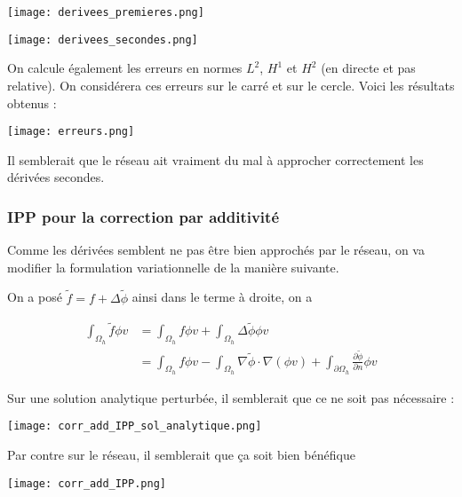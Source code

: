 \begin{minipage}{0.48\linewidth}
	\centering
	\texttt{[image: derivees\_premieres.png]}
\end{minipage}
\begin{minipage}{0.48\linewidth}
	\centering
	\texttt{[image: derivees\_secondes.png]}
\end{minipage}

\newpage

On calcule également les erreurs en normes $L^2$, $H^1$ et $H^2$ (en directe et pas relative). On considérera ces erreurs sur le carré et sur le cercle. Voici les résultats obtenus :

\begin{minipage}{\linewidth}
	\centering
	\texttt{[image: erreurs.png]}
\end{minipage}

\begin{Rem}
	Il semblerait que le réseau ait vraiment du mal à approcher correctement les dérivées secondes.
\end{Rem}

\subsubsection{IPP pour la correction par additivité}

Comme les dérivées semblent ne pas être bien approchés par le réseau, on va modifier la formulation variationnelle de la manière suivante.

On a posé $\tilde{f}=f+\Delta\tilde{\phi}$ ainsi dans le terme à droite, on a 

\begin{align*}
	\int_{\Omega_h} \tilde{f}\phi v &= \int_{\Omega_h} f\phi v + \int_{\Omega_h} \Delta\tilde{\phi}\phi v \\
	&=\int_{\Omega_h} f\phi v-\int_{\Omega_h}\nabla\tilde{\phi}\cdot\nabla(\phi v)+\int_{\partial\Omega_h} \frac{\partial\tilde{\phi}}{\partial n}\phi v
\end{align*}

Sur une solution analytique perturbée, il semblerait que ce ne soit pas nécessaire :

\begin{minipage}{\linewidth}
	\centering
	\texttt{[image: corr\_add\_IPP\_sol\_analytique.png]}
\end{minipage}

Par contre sur le réseau, il semblerait que ça soit bien bénéfique 

\begin{minipage}{\linewidth}
	\centering
	\texttt{[image: corr\_add\_IPP.png]}
\end{minipage}


